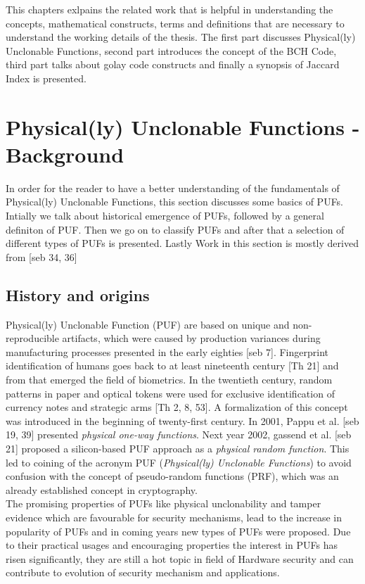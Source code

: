 This chapters exlpains the related work that is helpful in understanding the concepts, mathematical constructs, terms and definitions that are necessary to understand the working details of the thesis. The first part discusses Physical(ly) Unclonable Functions, second part introduces the concept of the BCH Code, third part talks about golay code constructs and finally a synopsis of Jaccard Index is presented.

\section{Physical(ly) Unclonable Functions - Background}
In order for the reader to have a better understanding of the fundamentals of Physical(ly) Unclonable Functions, this section discusses some basics of PUFs. Intially we talk about historical emergence of PUFs, followed by a general definiton of PUF. Then we go on to classify PUFs and after that a selection of different types of PUFs is presented. Lastly %
Work in this section is mostly derived from [seb 34, 36]\\

\subsection{History and origins}
Physical(ly) Unclonable Function (PUF) are based on unique and non-reproducible artifacts, which were caused by production variances during manufacturing processes presented in the early eighties [seb 7]. Fingerprint identification of humans goes back to at least nineteenth century [Th 21] and from that emerged the field of biometrics. In the twentieth century, random patterns in paper and optical tokens were used for exclusive identification of currency notes and strategic arms [Th 2, 8, 53]. A formalization of this concept was introduced in the beginning of twenty-first century. In 2001, Pappu et al. [seb 19, 39] presented \emph{physical one-way functions}. Next year 2002, gassend et al. [seb 21] proposed a silicon-based PUF approach as a \emph{physical random function}. This led to coining of the acronym PUF (\emph{Physical(ly) Unclonable Functions}) to avoid confusion with the concept of pseudo-random functions (PRF), which was an already established concept in cryptography.\\

The promising properties of PUFs like physical unclonability and tamper evidence which are favourable for security mechanisms, lead to the increase in popularity of PUFs and in coming years new types of PUFs were proposed. Due to their practical usages and encouraging properties the interest in PUFs has risen significantly, they are still a hot topic in field of Hardware security and can contribute to evolution of security mechanism and applications.\\

